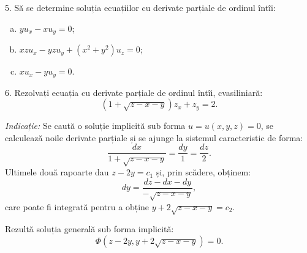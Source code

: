 \vspace{1cm}

5. Să se determine soluția ecuațiilor cu derivate parțiale de ordinul întîi:
\begin{enumerate}[(a)]
\item $ y u_x - x u_y = 0 $;
\item $ xz u_x - yz u_y + (x^2 + y^2) u_z = 0 $;
\item $ x u_x - y u_y = 0 $.
\end{enumerate}

\vspace{1cm}

6. Rezolvați ecuația cu derivate parțiale de ordinul întîi, cvasiliniară:
\[
  (1 + \sqrt{z - x - y})z_x + z_y = 2.
\]

\emph{Indicație:} Se caută o soluție implicită sub forma $ u = u(x, y, z) = 0 $, se calculează
noile derivate parțiale și se ajunge la sistemul caracteristic de forma:
\[
  \dfrac{dx}{1 + \sqrt{z - x - y}} = \dfrac{dy}{1} = \dfrac{dz}{2}.
\]
Ultimele două rapoarte dau $ z - 2y = c_1 $ și, prin scădere, obținem:
\[
  dy = \dfrac{dz - dx - dy}{-\sqrt{z - x - y}},
\]
care poate fi integrată pentru a obține $ y + 2 \sqrt{z - x - y} = c_2 $.

Rezultă soluția generală sub forma implicită:
\[
  \Phi(z - 2y, y + 2 \sqrt{z - x - y}) = 0.
\]


